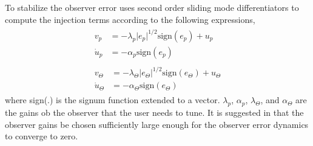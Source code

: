 \documentclass[letterpaper%
, twoside%
, 12pt%
,memoire%
, english%
,creativecommons,hyperref%
]{thETS}
\begin{document}
To stabilize the observer error \citep{bash2019analysis} uses second order sliding mode differentiators to compute the injection terms \citep{levant1998robust} according to the following expressions, 
\begin{subequations}
\label{sto}
\begin{align}
\begin{split}\label{eqn:STO5}
v_p&=-\lambda_p \vert e_p \vert ^{1/2}\text{sign}(e_p)+u_p \\
\dot{u}_p&=-\alpha_p \text{sign}(e_p)
\end{split}\\
\begin{split}\label{eqn:STO6}
v_\Theta&=-\lambda_\Theta \vert e_\Theta \vert ^{1/2}\text{sign}(e_\Theta)+u_\Theta \\
\dot{u}_\Theta&=-\alpha_\Theta \text{sign}(e_\Theta)
\end{split}
\end{align}
\end{subequations}
where sign(.) is the signum function extended to a vector. $\lambda_p$, $\alpha_p$, $\lambda_\Theta$, and $\alpha_\Theta$ are the gains ob the observer that the user needs to tune. It is suggested in \citep{levant1998robust} that the observer gains be chosen sufficiently large enough for the observer error dynamics to converge to zero. 
\end{document}
